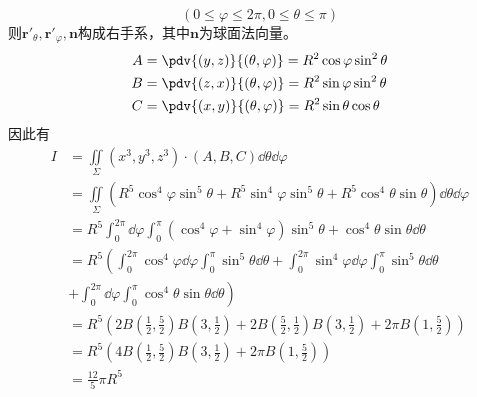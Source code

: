 \begin{solution}
\begin{enumerate}[(1)]
              \[ (0\leq \varphi \leq 2\pi, 0\leq \theta \leq \pi) \]
              则$\bm{r}'_\theta, \bm{r}'_\varphi, \bm{n}$构成右手系，其中$\bm{n}$为球面法向量。
              \begin{align*}
                  A & = \pdv{(y,z)}{(\theta,\varphi)} = R^2\cos\varphi\sin^2\theta \\
                  B & = \pdv{(z,x)}{(\theta,\varphi)} = R^2\sin\varphi\sin^2\theta \\
                  C & = \pdv{(x,y)}{(\theta,\varphi)} = R^2\sin\theta\cos\theta
              \end{align*}
              因此有
              \begin{align*}
                  I & =  \iint\limits_\Sigma (x^3,y^3,z^3)\cdot(A,B,C)\dd{\theta}\dd{\varphi}                                                                    \\
                    & =     \iint\limits_\Sigma (R^5\cos^4\varphi\sin^5\theta + R^5\sin^4\varphi\sin^5\theta + R^5\cos^4\theta\sin\theta)\dd{\theta}\dd{\varphi} \\
                    & =     R^5\int_0^{2\pi}\dd{\varphi}\int_0^{\pi} (\cos^4\varphi + \sin^4\varphi)\sin^5\theta + \cos^4\theta\sin\theta\dd{\theta}             \\
                    & =     R^5\left(\int_0^{2\pi} \cos^4\varphi \dd{\varphi}\int_0^{\pi}\sin^5\theta\dd{\theta}
                  + \int_0^{2\pi} \sin^4\varphi \dd{\varphi}\int_0^{\pi}\sin^5\theta\dd{\theta}\right.                                                           \\
                    & + \left.\int_0^{2\pi} \dd{\varphi}\int_0^{\pi} \cos^4\theta\sin\theta\dd{\theta}\right)                                                    \\
                    & = R^5\left(2B\left(\frac{1}{2},\frac{5}{2}\right)B\left(3,\frac{1}{2}\right)
                  + 2B\left(\frac{5}{2},\frac{1}{2}\right)B\left(3,\frac{1}{2}\right)
                  +2\pi B\left(1,\frac{5}{2}\right)\right)                                                                                                       \\
                    & =R^5\left(4B\left(\frac{1}{2},\frac{5}{2}\right)B\left(3,\frac{1}{2}\right)+2\pi B\left(1,\frac{5}{2}\right)\right)                        \\
                    & =\frac{12}{5}\pi R^5
              \end{align*}
    \end{enumerate}
\end{solution}

